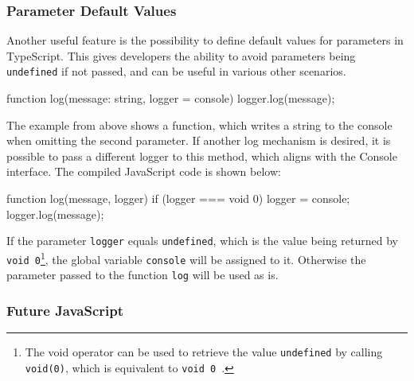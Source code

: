 \subsubsection{Parameter Default Values}
\label{sec:ts-parameter-default-values}

Another useful feature is the possibility to define default values for parameters in TypeScript. This gives developers the ability to avoid parameters being \texttt{undefined} if not passed, and can be useful in various other scenarios.
\begin{JsCode}[numbers=none]
function log(message: string, logger = console) {
  logger.log(message);
}
\end{JsCode}
The example from above shows a function, which writes a string to the console when omitting the second parameter. If another log mechanism is desired, it is possible to pass a different logger to this method, which aligns with the Console interface. The compiled JavaScript code is shown below:
\begin{JsCode}[numbers=none]
function log(message, logger) {
    if (logger === void 0) { logger = console; }
    logger.log(message);
}
\end{JsCode}
If the parameter \texttt{logger} equals \texttt{undefined}, which is the value being returned by \texttt{void 0}\footnote{The void operator can be used to retrieve the value \texttt{undefined} by calling \texttt{void(0)}, which is equivalent to \texttt{void 0}~\cite{void:MDN:2017}.}, the global variable \texttt{console} will be assigned to it. Otherwise the parameter passed to the function \texttt{log} will be used as is.


\subsubsection{Future JavaScript}
\label{sec:ts-future-javascript}

